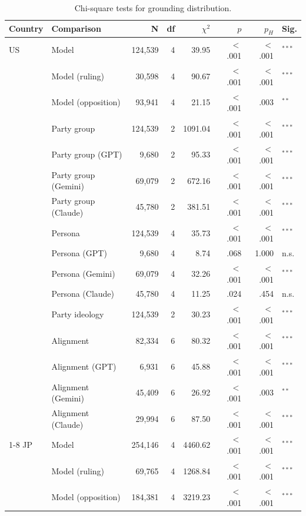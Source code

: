 \begin{table}[t]
\centering
\footnotesize
\setlength{\tabcolsep}{3pt}
\caption{Chi-square tests for grounding distribution.}
\label{tab:grounding-tests}
\begin{tabular}{llrrrrrl}
\toprule
\textbf{Country} & \textbf{Comparison} & \textbf{N} & \textbf{df} & \textbf{$\chi^2$} & \textbf{$p$} & \textbf{$p_H$} & \textbf{Sig.} \\
\midrule
US & Model & 124{,}539 & 4 & 39.95 & $<$.001 & $<$.001 & $^{***}$ \\
 & Model (ruling) & 30{,}598 & 4 & 90.67 & $<$.001 & $<$.001 & $^{***}$ \\
 & Model (opposition) & 93{,}941 & 4 & 21.15 & $<$.001 & .003 & $^{**}$ \\
 & Party group & 124{,}539 & 2 & 1091.04 & $<$.001 & $<$.001 & $^{***}$ \\
 & Party group (GPT) & 9{,}680 & 2 & 95.33 & $<$.001 & $<$.001 & $^{***}$ \\
 & Party group (Gemini) & 69{,}079 & 2 & 672.16 & $<$.001 & $<$.001 & $^{***}$ \\
 & Party group (Claude) & 45{,}780 & 2 & 381.51 & $<$.001 & $<$.001 & $^{***}$ \\
 & Persona & 124{,}539 & 4 & 35.73 & $<$.001 & $<$.001 & $^{***}$ \\
 & Persona (GPT) & 9{,}680 & 4 & 8.74 & .068 & 1.000 & n.s. \\
 & Persona (Gemini) & 69{,}079 & 4 & 32.26 & $<$.001 & $<$.001 & $^{***}$ \\
 & Persona (Claude) & 45{,}780 & 4 & 11.25 & .024 & .454 & n.s. \\
 & Party ideology & 124{,}539 & 2 & 30.23 & $<$.001 & $<$.001 & $^{***}$ \\
 & Alignment & 82{,}334 & 6 & 80.32 & $<$.001 & $<$.001 & $^{***}$ \\
 & Alignment (GPT) & 6{,}931 & 6 & 45.88 & $<$.001 & $<$.001 & $^{***}$ \\
 & Alignment (Gemini) & 45{,}409 & 6 & 26.92 & $<$.001 & .003 & $^{**}$ \\
 & Alignment (Claude) & 29{,}994 & 6 & 87.50 & $<$.001 & $<$.001 & $^{***}$ \\
\cmidrule(lr){1-8}
JP & Model & 254{,}146 & 4 & 4460.62 & $<$.001 & $<$.001 & $^{***}$ \\
 & Model (ruling) & 69{,}765 & 4 & 1268.84 & $<$.001 & $<$.001 & $^{***}$ \\
 & Model (opposition) & 184{,}381 & 4 & 3219.23 & $<$.001 & $<$.001 & $^{***}$ \\

\end{tabular}
\end{table}

